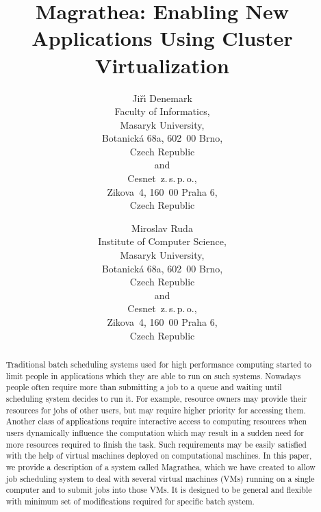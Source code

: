 \documentclass[times,10pt,twocolumn]{article}
\begin{document}
\title{Magrathea: Enabling New Applications Using Cluster Virtualization}


\author{Ji\v{r}\'\i{} Denemark\\
Faculty of Informatics,\\
Masaryk University,\\
Botanick\'a 68a, 602~00 Brno,\\
Czech Republic\\
and\\
Cesnet~z.\,s.\,p.\,o.,\\
Zikova~4, 160~00 Praha 6,\\
Czech Republic
\and
Miroslav Ruda\\
Institute of Computer Science,\\
Masaryk University,\\
Botanick\'a 68a, 602~00 Brno,\\
Czech Republic\\
and\\
Cesnet~z.\,s.\,p.\,o.,\\
Zikova~4, 160~00 Praha 6,\\
Czech Republic
}

\maketitle
\thispagestyle{empty}

\begin{abstract}

Traditional batch scheduling systems used for high performance computing
started to limit people in applications which they are able to run on such
systems. Nowadays people often require more than submitting a job to a queue
and waiting until scheduling system decides to run it. For example, resource
owners may provide their resources for jobs of other users, but may require
higher priority for accessing them. Another class of applications require
interactive access to computing resources when users dynamically influence the
computation which may result in a sudden need for more resources required to
finish the task. Such requirements may be easily satisfied with the help of
virtual machines deployed on computational machines. In this paper, we provide
a description of a system called Magrathea, which we have created to allow job
scheduling system to deal with several virtual machines (VMs) running on a
single computer and to submit jobs into those VMs. It is designed to be
general and flexible with minimum set of modifications required for specific
batch system.

\end{abstract}
\end{document}
